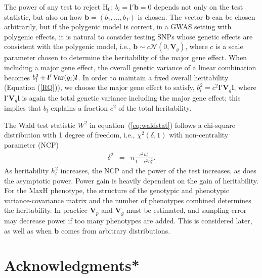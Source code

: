 \documentclass[11pt]{article}
\def\Var{\mathop{\rm Var}\nolimits}
\def\Var{\mathop{\rm Var}\nolimits}
\newcommand{\bea}{\begin{eqnarray}}
\newcommand{\eea}{\end{eqnarray}}
\newcommand{\Vbf}{{\bm V}}
\newcommand{\lbf}{{\bm l}}
\begin{document}
The power of any test to reject $\mbox{H}_0:\, b_l=\lbf'\bm{b}=0$ depends not only on the test statistic, but also on how $\bm{b}=(b_1,\ldots,b_T)$ is chosen.   The vector $\bm{b}$ can be chosen arbitrarily, but if the polygenic model is correct, in a GWAS setting with polygenic effects, it is natural to consider testing SNPs whose genetic effects  are consistent with the polygenic model, i.e., $\bm{b}\sim c\mathcal{N}(0,\Vbf_g)$, where $c$ is a scale parameter chosen to determine the heritability of the major gene effect. When including a major gene effect, the overall genetic variance of a linear combination becomes $b_l^2+\lbf'\Var(g_i)\lbf$. In order to maintain a fixed overall heritability (Equation (\ref{RQ})), we choose the major gene effect to satisfy, $
b_l^2=c^2\lbf'\Vbf_g\lbf$,
where $\lbf'\Vbf_g\lbf$ is again the total genetic variance including the major gene effect; this implies that $b_l$ explains a fraction $c^2$ of the total heritability. 

The Wald test statistic $W^2$ in equation~(\ref{eq:waldstat}) follows a chi-square distribution with 1 degree of freedom, i.e., $\chi^2(\delta,1)$ with non-centrality parameter (NCP)
\bea
\delta^2  & =  & n\frac{c^2h_l^2}{1-c^2h_l^2}. \label{NCPt}
\eea
As heritability $h_l^2$ increases, the NCP and the power of the test increases, as does the asymptotic power. Power gain is heavily dependent on the gain of heritability. For the MaxH phenotype, the structure of the genotypic and phenotypic variance-covariance matrix and the number of phenotypes combined determines the heritability. In practice $\Vbf_p$ and $\Vbf_g$ must be estimated, and sampling error may decrease power if too many phenotypes are added. This is considered later, as well as when $\bm{b}$ comes from arbitrary distributions. 



\clearpage
\section*{Acknowledgments*}
\end{document}
